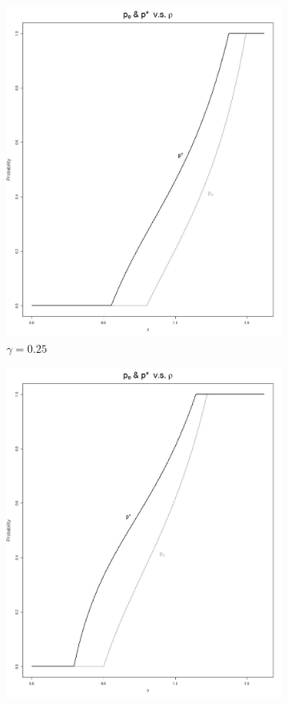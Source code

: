 \documentclass[11pt]{article}
\numberwithin{equation}{section}
\begin{document}
\newpage
\begin{figure}[h!]
	\centering
	\begin{subfigure}[b]{0.49\textwidth}
	\includegraphics[width=\textwidth]{plots/pe_vs_pstar_0_25.png}
		\caption{$\gamma=0.25$}
	\end{subfigure}
	\begin{subfigure}[b]{0.49\textwidth}
	\includegraphics[width=\textwidth]{plots/pe_vs_pstar_1.png}

\end{subfigure}
\end{figure}
\end{document}
